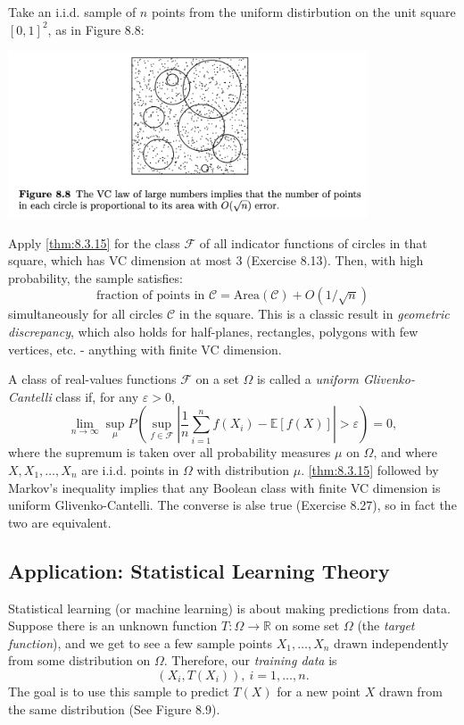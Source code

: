 \begin{example}[Discrepancy]
\label{ex:8.3.18}
Take an i.i.d. sample of $n$ points from the uniform distirbution on the unit square $[0, 1]^2$, as in Figure 
8.8:
\begin{center}
    \includegraphics[width=0.8\textwidth]{Chapter 8/fig8-8.png}
\end{center}

Apply \cref{thm:8.3.15} for the class $\mathcal{F}$ of all indicator functions of circles in that square, which 
has VC dimension at most 3 (Exercise 8.13). Then, with high probability, the sample satisfies:
\[ \text{fraction of points in } \mathcal{C} = \mathrm{Area}(\mathcal{C}) + O(1 / \sqrt{n}) \]
simultaneously for all circles $\mathcal{C}$ in the square. This is a classic result in \textit{geometric 
discrepancy}, which also holds for half-planes, rectangles, polygons with few vertices, etc. - anything with 
finite VC dimension.
\end{example}

\begin{remark}
\label{rmk:8.3.19}
A class of real-values functions $\mathcal{F}$ on a set $\Omega$ is called a \textit{uniform Glivenko-Cantelli} 
class if, for any $\varepsilon > 0$, 
\[ \lim_{n \to \infty} \sup_{\mu} P \left( \sup_{f \in \mathcal{F}} \left| \frac{1}{n} \sum_{i = 1}^{n} 
f(X_i) - \mathbb{E}\left[ f(X) \right] \right| > \varepsilon \right) = 0, \]
where the supremum is taken over all probability measures $\mu$ on $\Omega$, and where $X, X_1, \dots, X_n$ 
are i.i.d. points in $\Omega$ with distribution $\mu$. \cref{thm:8.3.15} followed by Markov's inequality implies 
that any Boolean class with finite VC dimension is uniform Glivenko-Cantelli. The converse is alse true 
(Exercise 8.27), so in fact the two are equivalent.
\end{remark}



\subsection{Application: Statistical Learning Theory}
Statistical learning (or machine learning) is about making predictions from data. Suppose there is an unknown 
function $T: \Omega \to \mathbb{R}$ on some set $\Omega$ (the \textit{target function}), and we get to see a 
few sample points $X_1, \dots, X_n$ drawn independently from some distribution on $\Omega$. Therefore, our 
\textit{training data} is 
\[ (X_i, T(X_i)), \ i = 1, \dots, n. \]
The goal is to use this sample to predict $T(X)$ for a new point $X$ drawn from the same distribution (See 
Figure 8.9).

